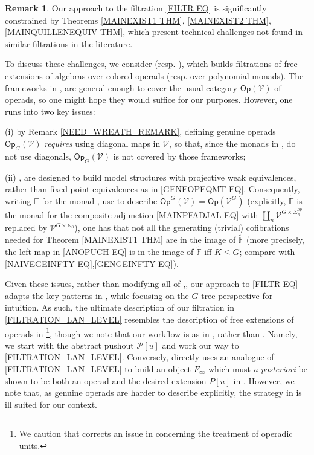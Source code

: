 \documentclass[a4paper,10pt
,draft
]{article}%
\numberwithin{equation}{section}
\numberwithin{figure}{section}
\theoremstyle{definition} %
\newtheorem{remark}[equation]{Remark}%
\newcommand{\V}{\ensuremath{\mathcal V}}
\newcommand{\1}{\ensuremath{\mathbbm 1}}%
\begin{document}
\begin{remark}\label{FILTCOMP REM}
	Our approach to the filtration \eqref{FILTR EQ}
	is significantly constrained by Theorems 
	\ref{MAINEXIST1 THM},
	\ref{MAINEXIST2 THM},
	\ref{MAINQUILLENEQUIV THM},
	which present technical challenges not found in similar filtrations in the literature.

	To discuss these challenges, we consider 
	\cite[Prop. 4.3.16]{WY18} (resp. \cite[\S 7]{BB17}),
	which builds filtrations of free extensions
	of algebras over colored operads
	(resp. over polynomial monads).
	The frameworks in \cite{WY18},\cite{BB17} are general enough
	to cover the usual category $\mathsf{Op}(\V)$ of operads,
	so one might hope they would suffice for our purposes.
%
	However, one runs into two key issues:
\begin{inparaenum}
\item[(i)]
	by Remark \ref{NEED_WREATH_REMARK},
	defining genuine operads $\mathsf{Op}_G(\V)$
	\emph{requires} using diagonal maps in $\V$,
	so that,
	since the monads in \cite{WY18},\cite{BB17}
	do not use diagonals,
	$\mathsf{Op}_G(\V)$
	is not covered by those frameworks;
\item[(ii)]
	\cite{WY18},\cite{BB17}
	are designed to build model structures
	with projective weak equivalences,
	rather than fixed point equivalences as in 	
	\eqref{GENEOPEQMT EQ}.
	Consequently, writing $\widetilde{\mathbb F}$ for the monad  \cite{WY18},\cite{BB17} use to describe
	$\mathsf{Op}^G(\V) = \mathsf{Op}(\V^G)$
	(explicitly, $\widetilde{\mathbb F}$
	is the monad for the composite adjunction 
	\eqref{MAINPFADJAL EQ}
	with 
	$\coprod_{n} \mathcal{V}^{G \times \Sigma_n^{op}}$
	replaced by $\mathcal{V}^{G \times \mathbb{N}_0}$),
	one has that not all the generating (trivial) cofibrations needed for 
	Theorem \ref{MAINEXIST1 THM}
	are in the image of $\widetilde{\mathbb{F}}$
	(more precisely, the left map in \eqref{ANOPUCH EQ}
	is in the image of $\widetilde{\mathbb{F}}$
	iff $K \leq G$;
	compare with \eqref{NAIVEGEINFTY EQ},\eqref{GENGEINFTY EQ}).
\end{inparaenum}

Given these issues, 
rather than modifying all of \cite{WY18},\cite{BB17},
our approach to \eqref{FILTR EQ} adapts the key patterns in
\cite{WY18},\cite{BB17} while focusing on
the $G$-tree perspective for intuition.
As such, the ultimate description of our filtration 
in \eqref{FILTRATION_LAN_LEVEL}
resembles the description of free extensions of operads in \cite[\S 5.11]{BM03}\footnote{We caution that
\cite[\S 3]{BM09}
corrects an issue in \cite{BM03} concerning the treatment of operadic units.},
though we note that our workflow is as in
\cite{WY18},\cite{BB17} rather than \cite{BM03}.
Namely, we start with the abstract pushout $\mathcal{P}[u]$
and work our way to \eqref{FILTRATION_LAN_LEVEL}.
%
Conversely, 
\cite{BM03} directly uses an analogue
of \eqref{FILTRATION_LAN_LEVEL} to build an object $F_{\infty}$
which must \emph{a posteriori}
be shown to be both an operad and the desired extension $P[u]$ in \cite[Prop. 5.1]{BM03}.
However, we note that, as genuine operads are harder to describe explicitly,
the strategy in \cite{BM03} is ill suited for our context.
\end{remark}
\end{document}

